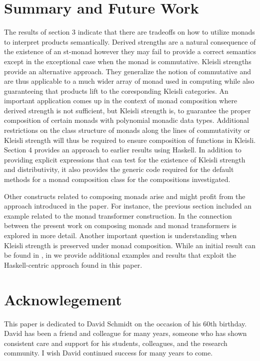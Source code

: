 \documentclass[submission,copyright]{eptcs}
\begin{document}
\section{Summary and Future Work}
The results of section 3 indicate that there are tradeoffs on how to utilize monads to interpret products semantically. Derived strengths are a natural consequence of the existence of an st-monad however they may fail to provide a correct semantics except in the exceptional case when the monad is commutative. Kleisli strengths provide an alternative approach. They generalize the notion of commutative and are thus applicable to a much wider array of monad used in computing while also guaranteeing that products lift to the coresponding Kleisli categories. An important application comes up in the context of monad composition where derived strength is not sufficient, but Kleisli strength is, to guarantee the proper composition of certain monads with polynomial monadic data types. Additional restrictions on the class structure of monads along the lines of commutativity or Kleisli strength will thus be required to ensure composition of functions in Kleisli. Section 4 provides an approach to earlier results using Haskell. In addition to providing explicit expressions that can test for the existence of Kleisli strength and distributivity, it also provides the generic code required for the default methods for a monad composition class for the compositions investigated.

  
Other constructs related to composing monads arise and might profit from the approach introduced in the paper. For instance, the previous section included an example related to the monad transformer construction. In \cite{articleH} the connection between the present work on composing monads and monad transformers is explored in more detail. Another important question is understanding when Kleisli strength is preserved under monad composition. While an initial result can be found in \cite{articleD}, in \cite{articleF} we provide additional examples and results that exploit the Haskell-centric approach found in this paper.


\section{Acknowlegement}

This paper is dedicated to David Schmidt on the occasion of his 60th birthday. David has been a friend and colleague for many years, someone who has shown consistent care and support for his students, colleagues, and the research community. I wish David continued success for many years to come.



\nocite{*}


\end{document}
